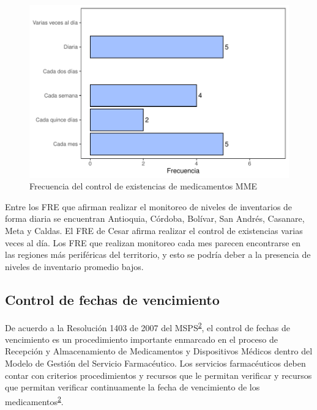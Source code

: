\documentclass[
]{book}
\begin{document}
\begin{figure}
\includegraphics[width=1\linewidth]{InformeFinal_files/figure-latex/FrecControlExistencias-1} \caption{Frecuencia del control de existencias de medicamentos MME}\label{fig:FrecControlExistencias}
\end{figure}

Entre los FRE que afirman realizar el monitoreo de niveles de inventarios de forma diaria se encuentran Antioquia, Córdoba, Bolívar, San Andrés, Casanare, Meta y Caldas. El FRE de Cesar afirma realizar el control de existencias varias veces al día. Los FRE que realizan monitoreo cada mes parecen encontrarse en las regiones más periféricas del territorio, y esto se podría deber a la presencia de niveles de inventario promedio bajos.

\hypertarget{control-de-fechas-de-vencimiento}{%
\subsection{Control de fechas de vencimiento}\label{control-de-fechas-de-vencimiento}}

De acuerdo a la Resolución 1403 de 2007 del MSPS\textsuperscript{\protect\hyperlink{ref-MinisteriodeSaludyProteccionSocial2007}{2}}, el control de fechas de vencimiento es un procedimiento importante enmarcado en el proceso de Recepción y Almacenamiento de Medicamentos y Dispositivos Médicos dentro del Modelo de Gestión del Servicio Farmacéutico. Los servicios farmacéuticos deben contar con criterios procedimientos y recursos que le permitan verificar y recursos que permitan verificar continuamente la fecha de vencimiento de los medicamentos\textsuperscript{\protect\hyperlink{ref-MinisteriodeSaludyProteccionSocial2007}{2}}.
\end{document}
